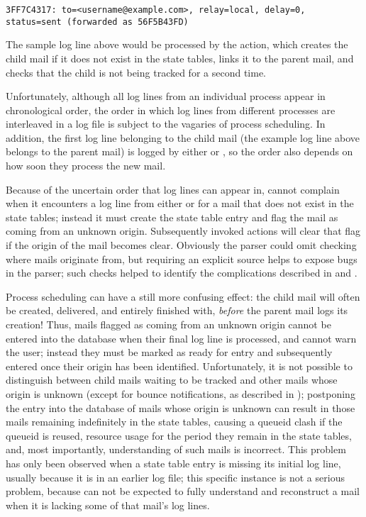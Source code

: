 \texttt{3FF7C4317: to=<username@example.com>, relay=local, \hfill{}
\newline{} \tab{} \tab{} delay=0, status=sent (forwarded as 56F5B43FD)}

The sample log line above would be processed by the  action,
which creates the child mail if it does not exist in the state tables,
links it to the parent mail, and checks that the child is not being tracked
for a second time.

Unfortunately, although all log lines from an individual process appear in
chronological order, the order in which log lines from different processes
are interleaved in a log file is subject to the vagaries of process
scheduling.  In addition, the first log line belonging to the child mail
(the example log line above belongs to the parent mail) is logged by either
 or , so the order also depends on how soon
they process the new mail.

Because of the uncertain order that log lines can appear in, \parsername{}
cannot complain when it encounters a log line from either  or
 for a mail that does not exist in the state tables;
instead it must create the state table entry and flag the mail as coming
from an unknown origin.  Subsequently invoked actions will clear that flag
if the origin of the mail becomes clear.  Obviously the parser could omit
checking where mails originate from, but requiring an explicit source helps
to expose bugs in the parser; such checks helped to identify the
complications described in  and
.

Process scheduling can have a still more confusing effect: the child mail
will often be created, delivered, and entirely finished with,
\textit{before\/} the parent mail logs its creation!  Thus, mails flagged
as coming from an unknown origin cannot be entered into the database when
their final log line is processed, and \parsername{} cannot warn the user;
instead they must be marked as ready for entry and subsequently entered
once their origin has been identified.  Unfortunately, it is not possible
to distinguish between child mails waiting to be tracked and other mails
whose origin is unknown (except for bounce notifications, as described in
); postponing the entry into
the database of mails whose origin is unknown can result in those mails
remaining indefinitely in the state tables, causing a queueid clash if the
queueid is reused, resource usage for the period they remain in the state
tables, and, most importantly, \parsernames{} understanding of such mails
is incorrect.  This problem has only been observed when a state table entry
is missing its initial log line, usually because it is in an earlier log
file; this specific instance is not a serious problem, because
\parsername{} can not be expected to fully understand and reconstruct a
mail when it is lacking some of that mail's log lines.

